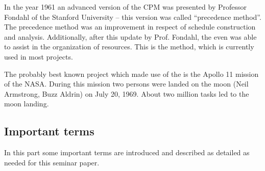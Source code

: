 In the year 1961 an advanced version of the CPM was presented by Professor Fondahl of the Stanford
University – this version was called “precedence method”. The precedence method was an improvement
in respect of schedule construction and analysis. Additionally, after this update by Prof. Fondahl,
the \cpm{} even was able to assist in the organization of resources. This is the
method, which is currently used in most projects\cite{Uher}.

The probably best known project which made use of the \cpm{} is the Apollo 11 mission
of the NASA. During this mission two persons were landed on the moon (Neil Armstrong, Buzz Aldrin)
on July 20, 1969. About two million tasks led to the moon landing. 

\subsection{Important terms}

In this part some important terms are introduced and described as detailed as needed for this
seminar paper. 

